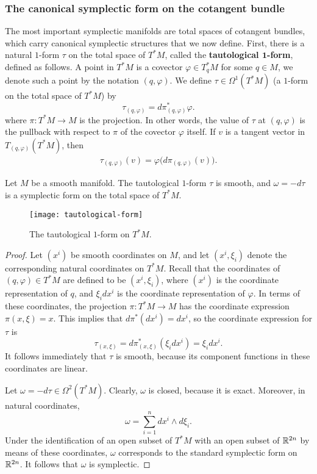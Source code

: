 \subsubsection{The canonical symplectic form on the cotangent bundle}
The most important symplectic manifolds are total spaces of cotangent bundles, which carry canonical symplectic structures that we now define. First, there is a natural $1$-form $\tau$ on the total space of $T^*M$, called the \textbf{tautological $\bm{1}$-form}, defined as follows. A point in $T^*M$ is a covector $\varphi\in T_q^*M$ for some $q\in M$, we denote such a point by the notation $(q,\varphi)$. We define $\tau\in\Omega^1(T^*M)$ (a $1$-form on the total space of $T^*M$) by
\[\tau_{(q,\varphi)}=d\pi^*_{(q,\varphi)}\varphi.\]
where $\pi:T^*M\to M$ is the projection. In other words, the value of $\tau$ at $(q,\varphi)$ is the pullback with respect to $\pi$ of the covector $\varphi$ itself. If $v$ is a tangent vector in $T_{(q,\varphi)}(T^*M)$, then
\begin{align}\label{tautological form def}
\tau_{(q,\varphi)}(v)=\varphi\big(d\pi_{(q,\varphi)}(v)\big).
\end{align}
\begin{proposition}\label{tautological form symplectic}
Let $M$ be a smooth manifold. The tautological $1$-form $\tau$ is smooth, and $\omega=-d\tau$ is a symplectic form on the total space of $T^*M$.
\end{proposition}
\begin{figure}[htbp]
\centering
\texttt{[image: tautological-form]}
\caption{The tautological $1$-form on $T^*M$.}
\end{figure}
\begin{proof}
Let $(x^i)$ be smooth coordinates on $M$, and let $(x^i,\xi_i)$ denote the corresponding natural coordinates on $T^*M$. Recall that the coordinates of $(q,\varphi)\in T^*M$ are defined to be $(x^i,\xi_i)$, where $(x^i)$ is the coordinate representation of $q$, and $\xi_idx^i$ is the coordinate representation of $\varphi$. In terms of these coordinates, the projection $\pi:T^*M\to M$ has the coordinate expression $\pi(x,\xi)=x$. This implies that $d\pi^*(dx^i)=dx^i$, so the coordinate expression for $\tau$ is
\[\tau_{(x,\xi)}=d\pi^*_{(x,\xi)}(\xi_idx^i)=\xi_idx^i.\]
It follows immediately that $\tau$ is smooth, because its component functions in these coordinates are linear.\par
Let $\omega=-d\tau\in\Omega^2(T^*M)$. Clearly, $\omega$ is closed, because it is exact. Moreover, in natural coordinates,
\[\omega=\sum_{i=1}^{n}dx^i\wedge d\xi_i.\]
Under the identification of an open subset of $T^*M$ with an open subset of $\mathbb{R}^{2n}$ by means of these coordinates, $\omega$ corresponds to the standard symplectic form on $\mathbb{R}^{2n}$. It follows that $\omega$ is symplectic.
\end{proof}
